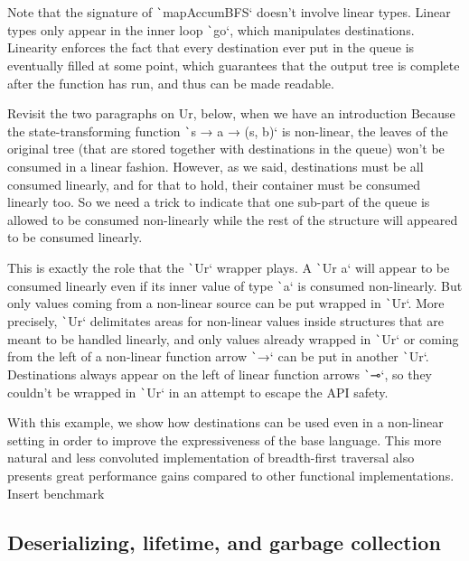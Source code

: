 \documentclass[english]{jflart}
\newcommand{\TODO}[1]{{\color{red}\large #1}}
\begin{document}
Note that the signature of \texttt`mapAccumBFS` doesn't involve linear types. Linear types only appear in the inner loop \texttt`go`, which manipulates destinations. Linearity enforces the fact that every destination ever put in the queue is eventually filled at some point, which guarantees that the output tree is complete after the function has run, and thus can be made readable.

\TODO{Revisit the two paragraphs on Ur, below, when we have an introduction}
Because the state-transforming function \texttt`s → a → (s, b)` is non-linear, the leaves of the original tree (that are stored together with destinations in the queue) won't be consumed in a linear fashion. However, as we said, destinations must be all consumed linearly, and for that to hold, their container must be consumed linearly too. So we need a trick to indicate that one sub-part of the queue is allowed to be consumed non-linearly while the rest of the structure will appeared to be consumed linearly.

This is exactly the role that the \texttt`Ur` wrapper plays. A \texttt`Ur a` will appear to be consumed linearly even if its inner value of type \texttt`a` is consumed non-linearly. But only values coming from a non-linear source can be put wrapped in \texttt`Ur`. More precisely, \texttt`Ur` delimitates areas for non-linear values inside structures that are meant to be handled linearly, and only values already wrapped in \texttt`Ur` or coming from the left of a non-linear function arrow \texttt`→` can be put in another \texttt`Ur`. Destinations always appear on the left of linear function arrows \texttt`⊸`, so they couldn't be wrapped in \texttt`Ur` in an attempt to escape the API safety.

With this example, we show how destinations can be used even in a non-linear setting in order to improve the expressiveness of the base language. This more natural and less convoluted implementation of breadth-first traversal also presents great performance gains compared to other functional implementations. \TODO{Insert benchmark}

\subsection{Deserializing, lifetime, and garbage collection}\label{ssec:parser-sexpr}
\end{document}
